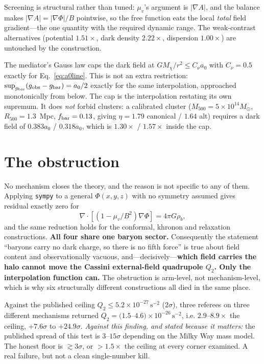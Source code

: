 \documentclass[aps,prd,twocolumn,superscriptaddress,nofootinbib,floatfix]{revtex4-2}
\begin{document}
Screening is structural rather than tuned: $\mu_v$'s argument is $|\nabla A|$, and the
balance makes $|\nabla A| = |\nabla\Phi|/B$ pointwise, so the free function eats the local
\emph{total} field gradient---the one quantity with the required dynamic range. The
weak-contrast alternatives (potential $1.51\times$, dark density $2.22\times$, dispersion
$1.00\times$) are untouched by the construction.

The mediator's Gauss law caps the dark field at
$GM_\chi/r^2 \le C_\nu a_0$ with $C_\nu = 0.5$ exactly for Eq.~\eqref{eq:a0line}. This is
not an extra restriction: $\sup_{g_{\rm bar}}(g_{\rm obs}-g_{\rm bar}) = a_0/2$ exactly for
the same interpolation, approached monotonically from below. The cap is the interpolation
restating its own supremum. It does \emph{not} forbid clusters: a calibrated cluster
($M_{500}=5\times10^{14}M_\odot$, $R_{500}=1.3$~Mpc, $f_{\rm bar}=0.13$, giving
$\eta = 1.79$ canonical / $1.64$ alt) requires a dark field of $0.383a_0$ / $0.318a_0$,
which is $1.30\times$ / $1.57\times$ inside the cap.

\section{The obstruction}

No mechanism closes the theory, and the reason is not specific to any of them.
Applying \texttt{sympy} to a general $\Phi(x,y,z)$ with no symmetry assumed gives residual
exactly zero for
\begin{equation}
\nabla\!\cdot\!\left[\left(1-\mu_v/B^2\right)\nabla\Phi\right] = 4\pi G\rho_b ,
\label{eq:armlevel}
\end{equation}
and the same reduction holds for the conformal, khronon and relaxation constructions.
\textbf{All four share one baryon sector.} Consequently the statement ``baryons carry no
dark charge, so there is no fifth force'' is true about field content and observationally
vacuous, and---decisively---\textbf{which field carries the halo cannot move the Cassini
external-field quadrupole $Q_2$. Only the interpolation function can.} The obstruction is
arm-level, not mechanism-level, which is why six structurally different constructions all
died in the same place.

Against the published ceiling $Q_2 \le 5.2\times10^{-27}\,\mathrm{s^{-2}}$ ($2\sigma$),
three referees on three different mechanisms returned
$Q_2 = (1.5$--$4.6)\times10^{-26}\,\mathrm{s^{-2}}$, i.e. $2.9$--$8.9\times$ the ceiling,
$+7.6\sigma$ to $+24.9\sigma$. \emph{Against this finding, and stated because it matters:}
the published spread of this test is $3$--$15\sigma$ depending on the Milky Way mass model.
The honest floor is $\gtrsim3\sigma$, or $>1.5\times$ the ceiling at every corner examined.
A real failure, but not a clean single-number kill.
\end{document}
